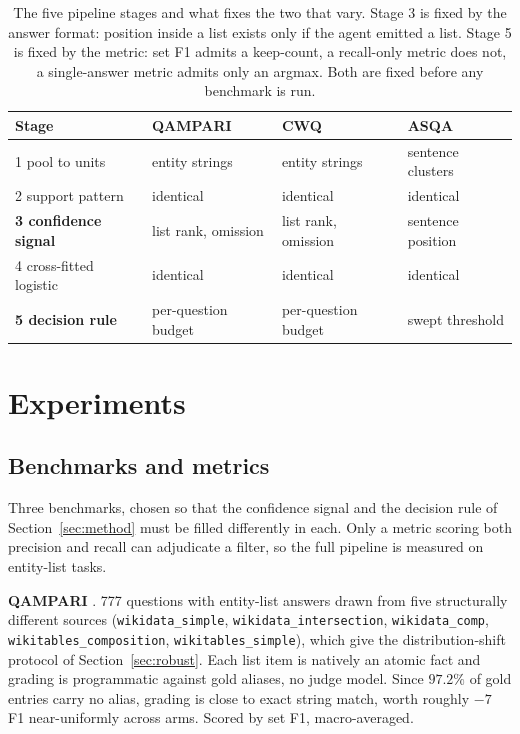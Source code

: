 \documentclass[11pt]{article}
\begin{document}
\begin{table}[t]
  \caption{The five pipeline stages and what fixes the two that vary. Stage 3 is fixed by the answer format: position inside a list exists only if the agent emitted a list. Stage 5 is fixed by the metric: set F1 admits a keep-count, a recall-only metric does not, a single-answer metric admits only an argmax. Both are fixed before any benchmark is run.}
  \label{tab:slots}
  \centering
  \begin{tabular}{llll}
    \toprule
    Stage & QAMPARI & CWQ & ASQA \\
    \midrule
    1 pool to units       & entity strings   & entity strings & sentence clusters  \\
    2 support pattern     & identical        & identical      & identical          \\
    \textbf{3 confidence signal} & list rank, omission & list rank, omission & sentence position \\
    4 cross-fitted logistic & identical      & identical      & identical          \\
    \textbf{5 decision rule}     & per-question budget & per-question budget & swept threshold \\
    \bottomrule
  \end{tabular}
\end{table}


\section{Experiments}
\label{sec:experiments}

\subsection{Benchmarks and metrics}
\label{sec:metrics}

Three benchmarks, chosen so that the confidence signal and the decision rule of Section~\ref{sec:method} must be filled differently in each. Only a metric scoring both precision and recall can adjudicate a filter, so the full pipeline is measured on entity-list tasks.

\textbf{QAMPARI} \citep{amouyal2022qampari}. 777 questions with entity-list answers drawn from five structurally different sources (\texttt{wikidata\_simple}, \texttt{wikidata\_intersection}, \texttt{wikidata\_comp}, \texttt{wikitables\_composition}, \texttt{wikitables\_simple}), which give the distribution-shift protocol of Section~\ref{sec:robust}.
Each list item is natively an atomic fact and grading is programmatic against gold aliases, no judge model. Since $97.2\%$ of gold entries carry no alias, grading is close to exact string match, worth roughly $-7$ F1 near-uniformly across arms. Scored by set F1, macro-averaged.
\end{document}
